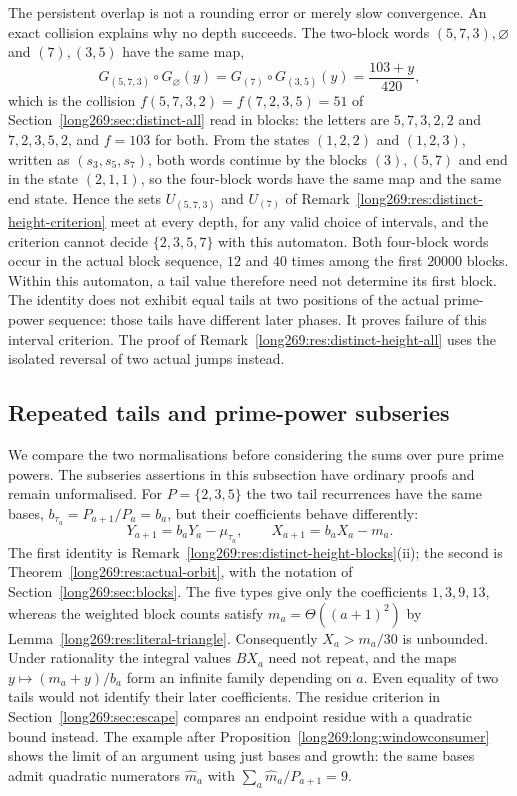 \documentclass[11pt]{article}
\theoremstyle{remark}
\theoremstyle{plain}
\begin{document}
The persistent overlap is not a rounding error or merely slow convergence.
An exact collision explains why no depth succeeds. The two-block words
$(5,7,3),\varnothing$ and $(7),(3,5)$ have the same map,
\[
 G_{(5,7,3)}\circ G_\varnothing(y)=G_{(7)}\circ G_{(3,5)}(y)=\frac{103+y}{420},
\]
which is the collision $f(5,7,3,2)=f(7,2,3,5)=51$ of
Section~\ref{long269:sec:distinct-all} read in blocks: the letters are
$5,7,3,2,2$ and $7,2,3,5,2$, and $f=103$ for both.  From the states
$(1,2,2)$ and $(1,2,3)$, written as $(s_3,s_5,s_7)$, both words continue by
the blocks $(3),(5,7)$ and end in the state $(2,1,1)$, so the four-block
words have the same map and the same end state.  Hence the sets $U_{(5,7,3)}$
and $U_{(7)}$ of Remark~\ref{long269:res:distinct-height-criterion} meet at
every depth, for any valid choice of intervals, and the criterion cannot
decide $\{2,3,5,7\}$ with this automaton.  Both four-block words occur in
the actual block sequence, $12$ and $40$ times among the first $20000$
blocks.  Within this automaton, a tail value therefore need not determine its first block. The identity does not exhibit equal tails at two positions of the actual prime-power sequence: those tails have different later phases. It proves failure of this interval criterion. The proof of Remark~\ref{long269:res:distinct-height-all} uses the isolated reversal of two actual jumps instead.

\subsection{Repeated tails and prime-power subseries}
\label{long269:sec:distinct-stop}

We compare the two normalisations before considering the sums over pure
prime powers. The subseries assertions in this subsection have ordinary
proofs and remain unformalised. For $P=\{2,3,5\}$ the two tail recurrences
have the same bases,
$b_{\tau_a}=P_{a+1}/P_a=b_a$, but their coefficients behave differently:
\[
 Y_{a+1}=b_aY_a-\mu_{\tau_a},\qquad
 X_{a+1}=b_aX_a-m_a.
\]
The first identity is Remark~\ref{long269:res:distinct-height-blocks}(ii);
the second is Theorem~\ref{long269:res:actual-orbit}, with the notation of
Section~\ref{long269:sec:blocks}. The five types give only the coefficients $1,3,9,13$, whereas the
weighted block counts satisfy
$m_a=\Theta((a+1)^2)$ by Lemma~\ref{long269:res:literal-triangle}.
Consequently $X_a>m_a/30$ is unbounded. Under rationality the integral
values $BX_a$ need not repeat, and the maps $y\mapsto(m_a+y)/b_a$ form
an infinite family depending on $a$. Even equality of two tails would
not identify their later coefficients. The residue criterion in
Section~\ref{long269:sec:escape} compares an endpoint residue with a
quadratic bound instead. The example after
Proposition~\ref{long269:long:windowconsumer} shows the limit of an argument
using just bases and growth: the same bases admit quadratic numerators
$\widehat m_a$ with $\sum_a\widehat m_a/P_{a+1}=9$.
\end{document}
